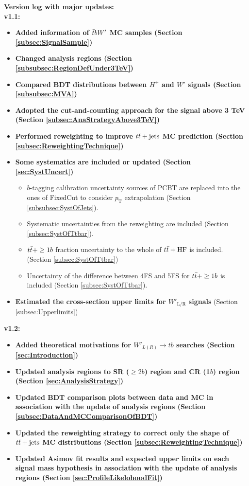 \textbf{Version log with major updates:}\\
\textbf{\color{blue}v1.1:}
\begin{itemize}
    \item \textbf{Added information of $\Bar{t}bW'$ MC samples (Section \ref{subsec:SignalSample})}
    \item \textbf{Changed analysis regions (Section \ref{subsubsec:RegionDefUnder3TeV})}
    \item \textbf{Compared BDT distributions between $H^{+}$ and $W'$ signals (Section \ref{subsubsec:MVA})}
    \item \textbf{Adopted the cut-and-counting approach for the signal above 3 TeV (Section \ref{subsec:AnaStrategyAbove3TeV})}
    \item \textbf{Performed reweighting to improve $t\Bar{t}+\text{jets}$ MC prediction (Section \ref{subsec:ReweightingTechnique})}
    \item \textbf{Some systematics are included or updated (Section \ref{sec:SystUncert})}
    \begin{itemize}
        \item $b$-tagging calibration uncertainty sources of PCBT are replaced into the ones of FixedCut to consider $p_{\text{T}}$ extrapolation (Section \ref{subsubsec:SystOfJets}).
        \item Systematic uncertainties from the reweighting are included (Section \ref{subsec:SystOfTtbar}).
        \item $t\Bar{t}+\geq1b$ fraction uncertainty to the whole of $t\Bar{t}+\text{HF}$ is included. (Section \ref{subsec:SystOfTtbar})
        \item Uncertainty of the difference between 4FS and 5FS for $t\Bar{t}+\geq1b$ is included (Section \ref{subsec:SystOfTtbar}).
    \end{itemize}
    \item \textbf{Estimated the cross-section upper limits for $W'_{\text{L/R}}$ signals} (Section \ref{subsec:Upperlimits})
\end{itemize}

\textbf{\color{blue}v1.2:}
\begin{itemize}
    \item \textbf{Added theoretical motivations for $W'_{L(R)} \rightarrow tb$ searches (Section \ref{sec:Introduction})}
    \item \textbf{Updated analysis regions to SR ($\geq2b$) region and CR (1$b$) region (Section \ref{sec:AnalysisStrategy})}
    \item \textbf{Updated BDT comparison plots between data and MC in association with the update of analysis regions (Section \ref{subsec:DataAndMCComparisonOfBDT})}
    \item \textbf{Updated the reweighting strategy to correct only the shape of $t\Bar{t}+\text{jets}$ MC distributions (Section \ref{subsec:ReweightingTechnique})}
    \item \textbf{Updated Asimov fit results and expected upper limits on each signal mass hypothesis in association with the update of analysis regions (Section \ref{sec:ProfileLikelohoodFit})}
\end{itemize}

